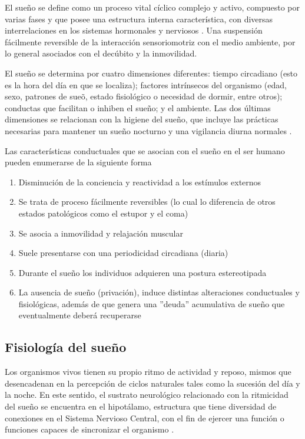 \documentclass[12pt,a4paper]{mitthesis}
\begin{document}
El sue\~no se define como un proceso vital c\'iclico complejo y activo, compuesto por varias 
fases y que posee una estructura interna caracter\'istica, con diversas interrelaciones en los 
sistemas hormonales y nerviosos \cite{FernandezConde07}. Una suspensi\'on f\'acilmente reversible 
de la interacci\'on sensoriomotriz con el medio ambiente, por lo general asociados con el 
dec\'ubito y la inmovilidad.

El sue\~no se determina por cuatro dimensiones diferentes: tiempo circadiano (esto es la hora 
del d\'ia en que se localiza); factores intr\'insecos del organismo (edad, sexo, patrones de 
sue\~o, estado fisiol\'ogico o necesidad de dormir, entre otros); conductas que facilitan o 
inhiben el sue\~no; y el ambiente. Las dos \'ultimas dimensiones se relacionan con la higiene 
del sueño, que incluye las pr\'acticas necesarias para mantener un sue\~no nocturno y una 
vigilancia diurna normales \cite{Sierra02}.

Las caracter\'isticas conductuales que se asocian con el sue\~no en el ser humano pueden 
enumerarse de la siguiente forma\cite{CarrilloMora} 
\begin{enumerate}
\item Disminuci\'on de la conciencia y reactividad a los est\'imulos externos
\item Se trata de proceso f\'acilmente reversibles (lo cual lo diferencia de otros estados 
patol\'ogicos como el estupor y el coma)
\item Se asocia a inmovilidad y relajaci\'on muscular
\item Suele presentarse con una periodicidad circadiana (diaria)
\item Durante el sue\~no los individuos adquieren una postura estereotipada
\item La ausencia de sue\~no (privaci\'on), induce distintas alteraciones conductuales y 
fisiol\'ogicas, adem\'as de que genera una ''deuda'' acumulativa de sueño que eventualmente 
deber\'a recuperarse 
\end{enumerate}

\subsection{Fisiolog\'ia del sueño}


Los organismos vivos tienen su propio ritmo de actividad y reposo, mismos que desencadenan en la 
percepci\'on de ciclos naturales tales como la sucesión del d\'ia y la noche. En este sentido, 
el sustrato neurol\'ogico relacionado con la ritmicidad del sueño se encuentra en el hipot\'alamo, 
estructura que tiene diversidad de conexiones en el Sistema Nervioso Central, con el fin de 
ejercer una funci\'on o funciones capaces de sincronizar el organismo 
\cite{FernandezConde07,Cabrera14}.
\end{document}
